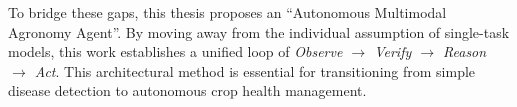 To bridge these gaps, this thesis proposes an ``Autonomous Multimodal Agronomy Agent''. By moving away from the individual assumption of single-task models, this work establishes a unified loop of \textit{Observe $\rightarrow$ Verify $\rightarrow$ Reason $\rightarrow$ Act}. This architectural method is essential for transitioning from simple disease detection to autonomous crop health management.




%
%
%
%
%
%
